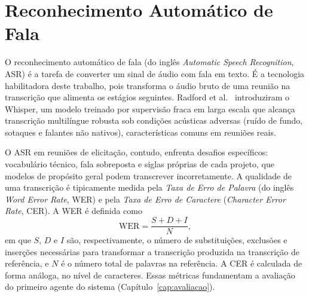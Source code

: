 \section{Reconhecimento Automático de Fala}
\label{sec:asr}

O reconhecimento automático de fala (do inglês \textit{Automatic Speech Recognition}, ASR) é a tarefa de converter um sinal de áudio com fala em texto. É a tecnologia habilitadora deste trabalho, pois transforma o áudio bruto de uma reunião na transcrição que alimenta os estágios seguintes. Radford et al.~\cite{whisper2022} introduziram o Whisper, um modelo treinado por supervisão fraca em larga escala que alcança transcrição multilíngue robusta sob condições acústicas adversas (ruído de fundo, sotaques e falantes não nativos), características comuns em reuniões reais.

O ASR em reuniões de elicitação, contudo, enfrenta desafios específicos: vocabulário técnico, fala sobreposta e siglas próprias de cada projeto, que modelos de propósito geral podem transcrever incorretamente. A qualidade de uma transcrição é tipicamente medida pela \textit{Taxa de Erro de Palavra} (do inglês \textit{Word Error Rate}, WER) e pela \textit{Taxa de Erro de Caractere} (\textit{Character Error Rate}, CER). A WER é definida como
\[
  \mathrm{WER} = \frac{S + D + I}{N},
\]
em que $S$, $D$ e $I$ são, respectivamente, o número de substituições, exclusões e inserções necessárias para transformar a transcrição produzida na transcrição de referência, e $N$ é o número total de palavras na referência. A CER é calculada de forma análoga, no nível de caracteres. Essas métricas fundamentam a avaliação do primeiro agente do sistema (Capítulo~\ref{cap:avaliacao}).
